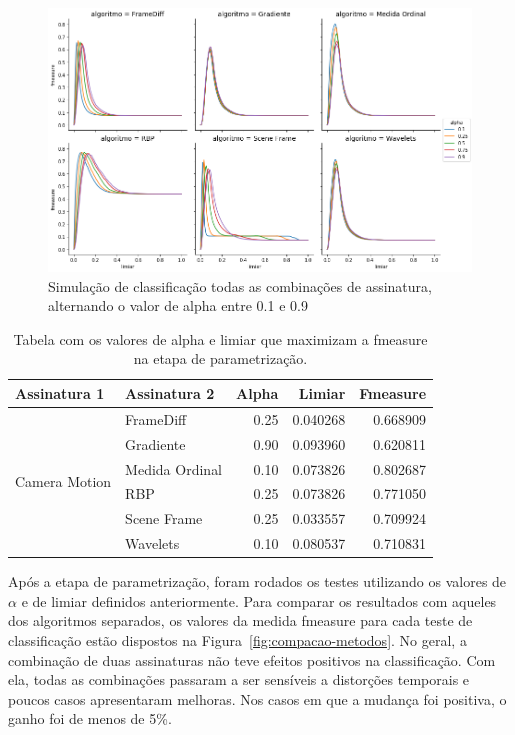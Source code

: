 \begin{figure}[h]
	\centering
	\caption{Simulação de classificação todas as combinações de assinatura, alternando o valor de alpha entre 0.1 e 0.9}
	\label{fig:alpha-limiar}
	\includegraphics[width=\textwidth]{dados/figuras/experimentos/alpha_juncao.png}
\end{figure}

\begin{table}[h]
\caption{Tabela com os valores de alpha e limiar que maximizam a fmeasure na etapa de parametrização.}
\label{tab:juncao-limiares-alpha}
\begin{tabular}{|l|l|r|r|r|}
\hline
\textbf{Assinatura 1} & \textbf{Assinatura 2} & \textbf{Alpha} & \textbf{Limiar} & \textbf{Fmeasure} \\\hline
\multirow{6}{*}{Camera Motion} & FrameDiff & 0.25 & 0.040268 & 0.668909 \\\cline{2-5}
& Gradiente & 0.90 & 0.093960 & 0.620811 \\\cline{2-5}
& Medida Ordinal & 0.10 & 0.073826 & 0.802687 \\\cline{2-5}
& RBP & 0.25 & 0.073826 & 0.771050 \\\cline{2-5}
& Scene Frame & 0.25 & 0.033557 & 0.709924 \\\cline{2-5}
& Wavelets & 0.10 & 0.080537 & 0.710831 \\\hline
	\end{tabular}
\end{table}

Após a etapa de parametrização, foram rodados os testes utilizando os valores de $\alpha$ e de limiar definidos anteriormente. Para comparar os resultados com aqueles dos algoritmos separados, os valores da medida fmeasure para cada teste de classificação estão dispostos na Figura~\ref{fig:compacao-metodos}. No geral, a combinação de duas assinaturas não teve efeitos positivos na classificação. Com ela, todas as combinações passaram a ser sensíveis a distorções temporais e poucos casos apresentaram melhoras. Nos casos em que a mudança foi positiva, o ganho foi de menos de 5\%. 

